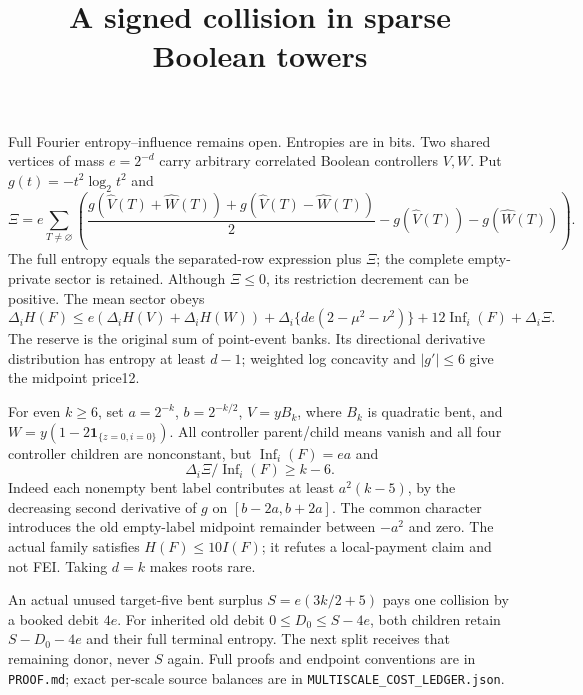 \documentclass{article}
\begin{document}
\title{A signed collision in sparse Boolean towers}\date{}\maketitle
Full Fourier entropy--influence remains open. Entropies are in bits.
Two shared vertices of mass $e=2^{-d}$ carry arbitrary correlated Boolean
controllers $V,W$. Put $g(t)=-t^2\log_2t^2$ and
\[
 \Xi=e\sum_{T\ne\varnothing}
 \left(\frac{g(\widehat V(T)+\widehat W(T))+g(\widehat V(T)-\widehat W(T))}{2}
       -g(\widehat V(T))-g(\widehat W(T))\right).
\]
The full entropy equals the separated-row expression plus $\Xi$;
the complete empty-private sector is retained. Although $\Xi\le0$,
its restriction decrement can be positive. The mean sector obeys
\[
 \Delta_iH(F)\le e(\Delta_iH(V)+\Delta_iH(W))+
 \Delta_i\{de(2-\mu^2-\nu^2)\}+12\operatorname{Inf}_i(F)+\Delta_i\Xi.
\]
The reserve is the original sum of point-event banks. Its directional
derivative distribution has entropy at least $d-1$; weighted log concavity
and $|g'|\le6$ give the midpoint price12.

For even $k\ge6$, set $a=2^{-k}$, $b=2^{-k/2}$, $V=yB_k$, where $B_k$
is quadratic bent, and $W=y(1-2\mathbf1_{\{z=0,i=0\}})$.
All controller parent/child means vanish and all four controller children
are nonconstant, but $\operatorname{Inf}_i(F)=ea$ and
\[
 \Delta_i\Xi/\operatorname{Inf}_i(F)\ge k-6.
\]
Indeed each nonempty bent label contributes at least $a^2(k-5)$,
by the decreasing second derivative of $g$ on $[b-2a,b+2a]$.
The common character introduces the old empty-label midpoint remainder
between $-a^2$ and zero. The actual family satisfies $H(F)\le10I(F)$;
it refutes a local-payment claim and not FEI. Taking $d=k$ makes roots rare.

An actual unused target-five bent surplus $S=e(3k/2+5)$ pays one collision
by a booked debit $4e$. For inherited old debit $0\le D_0\le S-4e$,
both children retain $S-D_0-4e$ and their full terminal entropy.
The next split receives that remaining donor, never $S$ again.
Full proofs and endpoint conventions are in \texttt{PROOF.md}; exact
per-scale source balances are in \texttt{MULTISCALE\_COST\_LEDGER.json}.
\end{document}
